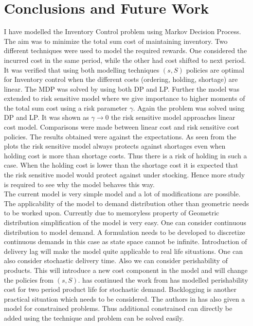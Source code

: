 \documentclass[11pt,a4paper,oneside]{report}
\begin{document}
\chapter{Conclusions and Future Work}
I have modelled the Inventory Control problem using Markov Decision Process. The aim was to minimize the total sum cost of maintaining inventory. Two different techniques were used to model the required rewards. One considered the incurred cost in the same period, while the other had cost shifted to next period. It was verified that using both modelling techniques $(s,S)$ policies are optimal for Inventory control when the different costs (ordering, holding, shortage) are linear. The MDP was solved by using both DP and LP. Further the model was extended to risk sensitive model where we give importance to higher moments of the total sum cost using a risk parameter $\gamma$. Again the problem was solved using DP and LP. It was shown as $\gamma \rightarrow 0$ the risk sensitive model approaches linear cost model. Comparisons were made between linear cost and risk sensitive cost policies. The results obtained were against the expectations. As seen from the plots the risk sensitive model always protects against shortages even when holding cost is more than shortage costs. Thus there is a risk of holding in such a case. When the holding cost is lower than the shortage cost it is expected that the risk sensitive model would protect against under stocking. Hence more study is required to see why the model behaves this way.\\ 

The current model is very simple model and a lot of modifications are possible. The applicability of the model to demand distribution other than geometric needs to be worked upon. Currently due to memoryless property of Geometric distribution simplification of the model is very easy. One can consider continuous distribution to model demand. A formulation needs to be developed to discretize continuous demands in this case as state space cannot be infinite. Introduction of delivery lag will make the model quite applicable to real life situations. One can also consider stochastic delivery time. Also we can consider perishability of products. This will introduce a new cost component in the model and will change the policies from $(s, S)$. \cite{nahmias1973optimal} has continued the work from \cite{scarf1959optimality} has modelled perishability cost for two period product life for stochastic demand. Backlogging is another practical situation which needs to be considered. The authors in \citep{kumar2015finite} has also given a model for constrained problems. Thus additional constrained can directly be added using the technique and problem can be solved easily.\\
\end{document}
